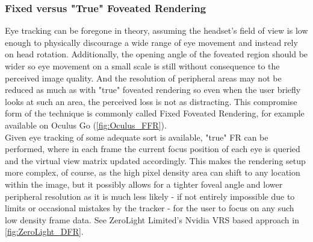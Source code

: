 \subsubsection{Fixed versus "True" Foveated Rendering}
Eye tracking can be foregone in theory, assuming the headset's field of view is low enough to physically discourage a wide range of eye movement and instead rely on head rotation. Additionally, the opening angle of the foveated region should be wider so eye movement on a small scale is still without consequence to the perceived image quality. And the resolution of peripheral areas may not be reduced as much as with "true" foveated rendering so even when the user briefly looks at such an area, the perceived loss is not as distracting. This compromise form of the technique is commonly called Fixed Foveated Rendering, for example available on Oculus Go (\autoref{fig:Oculus_FFR}). \\
Given eye tracking of some adequate sort is available, "true" FR can be performed, where in each frame the current focus position of each eye is queried and the virtual view matrix updated accordingly. This makes the rendering setup more complex, of course, as the high pixel density area can shift to any location within the image, but it possibly allows for a tighter foveal angle and lower peripheral resolution as it is much less likely - if not entirely impossible due to limits or occasional mistakes by the tracker - for the user to focus on any such low density frame data. See ZeroLight Limited's Nvidia VRS based approach in \autoref{fig:ZeroLight_DFR}. \\

